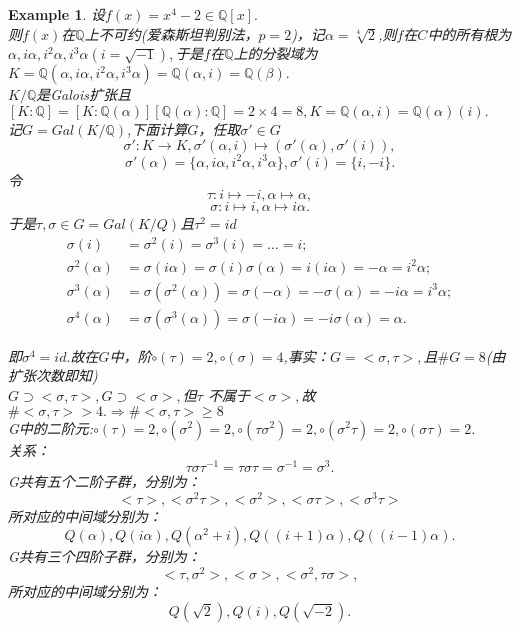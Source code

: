 \documentclass[UTF8]{article}
\newtheorem{exa}{Example}[section]
\begin{document}
\begin{exa}
设$f(x)=x^4-2\in \mathbb{Q}[x].$\\
则$f(x)$在$\mathbb{Q}$上不可约(爱森斯坦判别法，$p=2$)，记$\alpha=\sqrt[4]{2}$,则$f$在$C$中的所有根为
$\alpha,i\alpha,i^2\alpha,i^3\alpha(i=\sqrt{-1}),$于是$f$在$\mathbb{Q}$上的分裂域为$K=\mathbb{Q}(\alpha,i\alpha,i^2\alpha,i^3\alpha)=\mathbb{Q}(\alpha,i)=\mathbb{Q}(\beta).$\\
$K/\mathbb{Q}$是Galois扩张且$[K:\mathbb{Q}]=[K:\mathbb{Q}(\alpha)][\mathbb{Q}(\alpha):\mathbb{Q}]=2\times4=8,K=\mathbb{Q}(\alpha,i)=\mathbb{Q}(\alpha)(i).$\\
记$G=Gal(K/\mathbb{Q})$,下面计算$G$，任取$\sigma'\in G$\\
$$\sigma':K\longrightarrow K,\sigma'(\alpha,i)\longmapsto(\sigma'(\alpha),\sigma'(i)),$$
$$
\sigma'(\alpha)=\{\alpha,i\alpha,i^2\alpha,i^3\alpha\},\sigma'(i)=\{i,-i\}.$$
令
$$\tau:i\longmapsto -i,\alpha\longmapsto \alpha,$$
$$
\sigma:i\longmapsto i,\alpha\longmapsto i\alpha.$$
于是$\tau,\sigma \in G=Gal(K/Q)$且$\tau^2=id$\\
\[
\begin{split}
\sigma(i)&=\sigma^2(i)=\sigma^3(i)=\ldots=i;\\
\sigma^2(\alpha)&=\sigma(i\alpha)=\sigma(i)\sigma(\alpha)=i(i\alpha)=-\alpha=i^2\alpha;\\
\sigma^3(\alpha)&=\sigma(\sigma^2(\alpha))=\sigma(-\alpha)=-\sigma(\alpha)=-i\alpha=i^3\alpha;\\
\sigma^4(\alpha)&=\sigma(\sigma^3(\alpha))=\sigma(-i\alpha)=-i\sigma(\alpha)=\alpha.
\end{split}
\]

即$\sigma^4=id.$故在$G$中，阶$\circ(\tau)=2,\circ(\sigma)=4$,事实：$G=<\sigma,\tau>,$且$\#G=8$(由扩张次数即知)\\
$G\supset<\sigma,\tau>,G\supset<\sigma>,$但$\tau$ 不属于$<\sigma>,$故
$\#<\sigma,\tau>>4.\Rightarrow\#<\sigma,\tau>\geqslant 8$\\
G中的二阶元:$\circ(\tau)=2,\circ(\sigma^2)=2,\circ(\tau\sigma^2)=2,\circ(\sigma^2\tau)=2,\circ(\sigma\tau)=2.$\\
关系：
$$\tau\sigma\tau^{-1}=\tau\sigma\tau=\sigma^{-1}=\sigma^3.$$
G共有五个二阶子群，分别为：
$$<\tau>,<\sigma^2\tau>,<\sigma^2>,<\sigma\tau>,<\sigma^3\tau>$$所对应的中间域分别为：
$$Q(\alpha),Q(i\alpha),Q(\alpha^2+i),Q((i+1)\alpha),Q((i-1)\alpha).$$
G共有三个四阶子群，分别为：
$$<\tau,\sigma^2>,<\sigma>,<\sigma^2,\tau\sigma>,$$所对应的中间域分别为：
$$Q(\sqrt{2}),Q(i),Q(\sqrt{-2}).$$
\end{exa}
\end{document}
